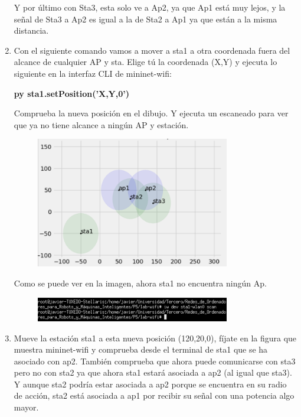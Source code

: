 \documentclass[12pt, a4paper]{report}
\begin{document}
\begin{enumerate}
	Y por último con Sta3, esta solo ve a Ap2, ya que Ap1 está muy lejos, y la señal de Sta3 a Ap2 es igual a la de Sta2 a Ap1 ya que están a la misma distancia.
	\item Con el siguiente comando vamos a mover a sta1 a otra coordenada fuera del alcance de cualquier
	AP y sta. Elige tú la coordenada (X,Y) y ejecuta lo siguiente en la interfaz CLI de mininet-wifi:
	\begin{center}
		\textbf{py sta1.setPosition('X,Y,0')}
	\end{center}
	Comprueba la nueva posición en el dibujo. Y ejecuta un escaneado para ver que ya no tiene
	alcance a ningún AP y estación.
	\begin{figure}[H]
		\centering
		\includegraphics[width=0.8\textwidth]{ej1.16_1}
	\end{figure}
	Como se puede ver en la imagen, ahora sta1 no encuentra ningún Ap.
	\begin{figure}[H]
		\centering
		\includegraphics[width=0.8\textwidth]{ej1.16_2}
	\end{figure}
	\item Mueve la estación sta1 a esta nueva posición (120,20,0), fíjate en la figura que muestra mininet-wifi y comprueba desde el terminal de sta1 que se ha asociado con ap2. También comprueba que
	ahora puede comunicarse con sta3 pero no con sta2 ya que ahora sta1 estará asociada a ap2
	(al igual que sta3). Y aunque sta2 podría estar asociada a ap2 porque se encuentra en su radio
	de acción, sta2 está asociada a ap1 por recibir su señal con una potencia algo mayor.\\
	

\end{enumerate}
\end{document}
